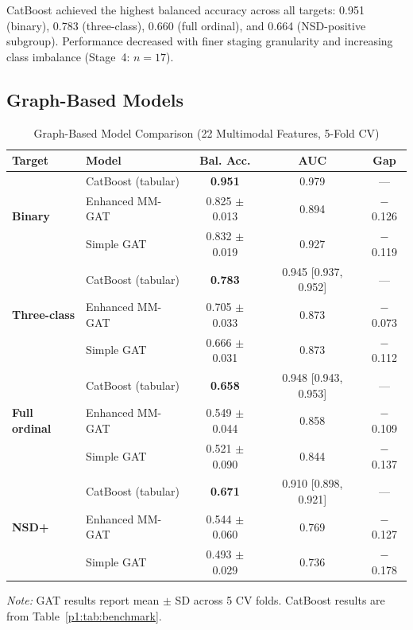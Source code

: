 CatBoost achieved the highest balanced accuracy across all targets: 0.951 (binary), 0.783 (three-class), 0.660 (full ordinal), and 0.664 (NSD-positive subgroup). Performance decreased with finer staging granularity and increasing class imbalance (Stage~4: $n{=}17$).

\subsection{Graph-Based Models}

\begin{table}[!t]
\caption{Graph-Based Model Comparison (22 Multimodal Features, 5-Fold CV)}
\label{p1:tab:gat}
\centering
\footnotesize
\setlength{\tabcolsep}{3pt}
\begin{tabular}{@{}llccc@{}}
\toprule
\textbf{Target} & \textbf{Model} & \textbf{Bal. Acc.} & \textbf{AUC} & \textbf{Gap} \\
\midrule
\multirow{3}{*}{\textbf{Binary}}
 & CatBoost (tabular) & \textbf{0.951} & 0.979 & --- \\
 & Enhanced MM-GAT & 0.825 $\pm$ 0.013 & 0.894 & $-$0.126 \\
 & Simple GAT & 0.832 $\pm$ 0.019 & 0.927 & $-$0.119 \\
\midrule
\multirow{3}{*}{\textbf{Three-class}}
 & CatBoost (tabular) & \textbf{0.783} & 0.945 [0.937, 0.952] & --- \\
 & Enhanced MM-GAT & 0.705 $\pm$ 0.033 & 0.873 & $-$0.073 \\
 & Simple GAT & 0.666 $\pm$ 0.031 & 0.873 & $-$0.112 \\
\midrule
\multirow{3}{*}{\textbf{Full ordinal}}
 & CatBoost (tabular) & \textbf{0.658} & 0.948 [0.943, 0.953] & --- \\
 & Enhanced MM-GAT & 0.549 $\pm$ 0.044 & 0.858 & $-$0.109 \\
 & Simple GAT & 0.521 $\pm$ 0.090 & 0.844 & $-$0.137 \\
\midrule
\multirow{3}{*}{\textbf{NSD+}}
 & CatBoost (tabular) & \textbf{0.671} & 0.910 [0.898, 0.921] & --- \\
 & Enhanced MM-GAT & 0.544 $\pm$ 0.060 & 0.769 & $-$0.127 \\
 & Simple GAT & 0.493 $\pm$ 0.029 & 0.736 & $-$0.178 \\
\bottomrule
\end{tabular}
\vspace{2pt}

\raggedright\scriptsize\textit{Note:} GAT results report mean $\pm$ SD across 5 CV folds. CatBoost results are from Table~\ref{p1:tab:benchmark}.
\end{table}

